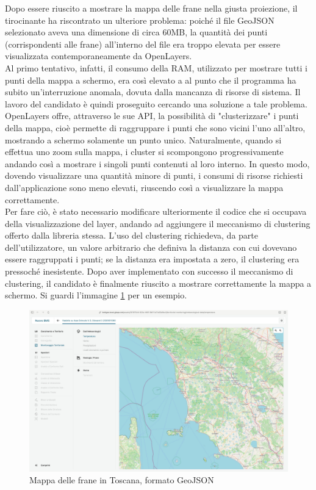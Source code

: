 Dopo essere riuscito a mostrare la mappa delle frane nella giusta proiezione, il tirocinante ha riscontrato un ulteriore problema: poiché il file GeoJSON selezionato aveva una dimensione di circa 60MB, la quantità dei punti (corrispondenti alle frane) all'interno del file era troppo elevata per essere visualizzata contemporaneamente da OpenLayers.
\\Al primo tentativo, infatti, il consumo della RAM, utilizzato per mostrare tutti i punti della mappa a schermo, era così elevato a al punto che il programma ha subito un'interruzione anomala, dovuta dalla mancanza di risorse di sistema. Il lavoro del candidato è quindi proseguito cercando una soluzione a tale problema.
\\OpenLayers offre, attraverso le sue API, la possibilità di "clusterizzare" i punti della mappa, cioè permette di raggruppare i punti che sono vicini l'uno all'altro, mostrando a schermo solamente un punto unico. Naturalmente, quando si effettua uno zoom sulla mappa, i cluster si scompongono progressivamente andando così a mostrare i singoli punti contenuti al loro interno. In questo modo, dovendo visualizzare una quantità minore di punti, i consumi di risorse richiesti dall'applicazione sono meno elevati, riuscendo così a visualizzare la mappa correttamente.
\\Per fare ciò, è stato necessario modificare ulteriormente il codice che si occupava della visualizzazione del layer, andando ad aggiungere il meccanismo di clustering offerto dalla libreria stessa. L'uso del clustering richiedeva, da parte dell'utilizzatore, un valore arbitrario che definiva la distanza con cui dovevano essere raggruppati i punti; se la distanza era impostata a zero, il clustering era pressoché inesistente. Dopo aver implementato con successo il meccanismo di clustering, il candidato è finalmente riuscito a mostrare correttamente la mappa a schermo. Si guardi l'immagine \ref{fig:toscanaGeoJSON} per un esempio.
\begin{figure}[htbp]
      \centering
      \includegraphics[width=1\textwidth]{Tesi/images/Capitolo4/toscanaGeoJSON.jpg}
      \caption{Mappa delle frane in Toscana, formato GeoJSON}
      \label{fig:toscanaGeoJSON}
\end{figure}

